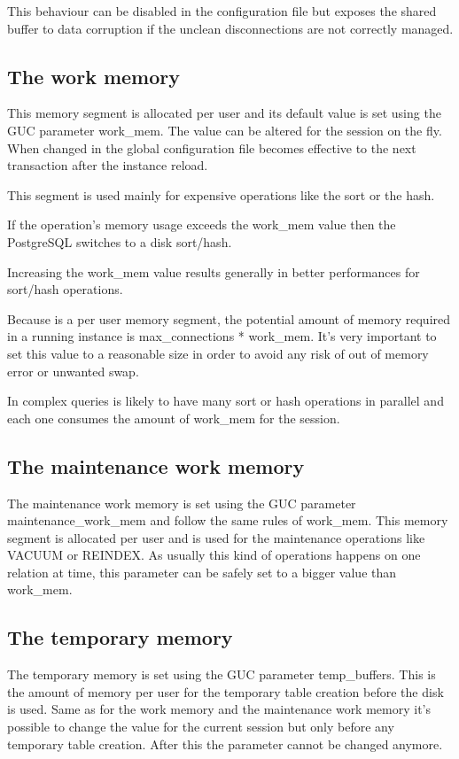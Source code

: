 This behaviour can be disabled in the configuration file but exposes the shared 
buffer to data corruption if the unclean disconnections are not correctly 
managed.



\subsection{The work memory}
\label{sub:WORKMEM}
This memory segment is allocated per user and its default value is set using 
the GUC parameter work\_mem. The value can be altered for the session on the 
fly. When changed in the global configuration file becomes effective to the 
next transaction after the instance reload. 

This segment is used mainly for expensive operations like the sort or the 
hash.

If the operation's memory usage exceeds the work\_mem value then the PostgreSQL 
switches to a disk sort/hash. 

Increasing the work\_mem value results generally in better performances for 
sort/hash operations. 

Because is a per user memory segment, the potential amount of memory 
required in a running instance is max\_connections * work\_mem. It's very 
important to set this value to a reasonable size in order to avoid any risk of 
out of memory error or unwanted swap.

In complex queries is likely to have many sort or hash operations in parallel 
and each one consumes the amount of work\_mem for the 
session.


\subsection{The maintenance work memory}
The maintenance work memory is set using the GUC parameter 
maintenance\_work\_mem and follow the same rules of work\_mem. This memory 
segment is allocated per user and is used for the maintenance operations 
like VACUUM or REINDEX. As usually this kind of operations happens on one 
relation at time, this parameter can be safely set to a bigger value than 
work\_mem.

\subsection{The temporary memory}
\label{sub:TEMPBUF}
The temporary memory is set using the GUC parameter temp\_buffers. This is the 
amount of memory per user for the temporary table creation before the disk is 
used. Same as for the work memory and the maintenance work memory it's possible 
to change the value for the current session but only before any temporary table 
creation. After this the parameter cannot be changed anymore.


